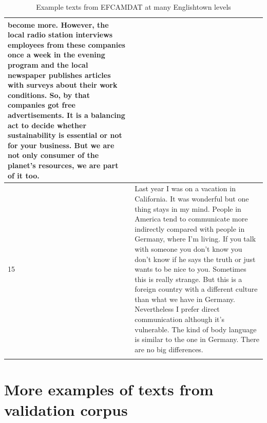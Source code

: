 \documentclass[11pt,a4paper]{article}
\begin{document}
\begin{longtable}{l|p{}}
  become more. However, the local radio station interviews employees from these
  companies once a week in the evening program and the local newspaper
  publishes articles with surveys about their work conditions. So, by that
  companies got free advertisements. It is a balancing act to decide whether
  sustainability is essential or not for your business. But we are not only
  consumer of the planet's resources, we are part of it too.\\
  \midrule
  15 & Last year I was on a vacation in California. It was wonderful but one
  thing stays in my mind. People in America tend to communicate more indirectly
  compared with people in Germany, where I'm living. If you talk with someone
  you don't know you don't know if he says the truth or just wants to be nice
  to you. Sometimes this is really strange. But this is a foreign country with
  a different culture than what we have in Germany. Nevertheless I prefer
  direct communication although it's vulnerable. The kind of body language is
  similar to the one in Germany. There are no big differences.\\
  \bottomrule
  \caption{Example texts from EFCAMDAT at many Englishtown levels}
\end{longtable}

\section{More examples of texts from validation corpus}
\end{document}
